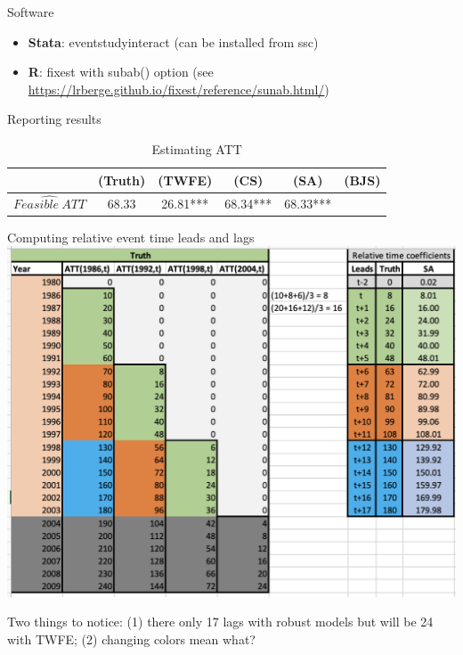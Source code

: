 \documentclass{beamer}
\begin{document}
\begin{frame}{Software}

\begin{itemize}
\item \textbf{Stata}: eventstudyinteract (can be installed from ssc)
\item \textbf{R}: fixest with subab() option (see \url{https://lrberge.github.io/fixest/reference/sunab.html/})
\end{itemize}


\end{frame}


\begin{frame}{Reporting results}
\begin{table}[htbp]\centering
\small
\caption{Estimating ATT}
\begin{center}
\begin{tabular}{l*{5}{c}}
\hline
\multicolumn{1}{l}{\textbf{}}&
\multicolumn{1}{c}{\textbf{(Truth)}}&
\multicolumn{1}{c}{\textbf{(TWFE)}}&
\multicolumn{1}{c}{\textbf{(CS)}}&
\multicolumn{1}{c}{\textbf{(SA)}}&
\multicolumn{1}{c}{\textbf{(BJS)}}\\
\hline
$\widehat{Feasible\ ATT}$  & 68.33    & 26.81*** & 68.34*** & 68.33***&\\
\hline
\end{tabular}
\end{center}
\end{table}

\end{frame}

\begin{frame}{Computing relative event time leads and lags }
             \includegraphics[scale=0.45]{./lecture_includes/sa_leads}

Two things to notice: (1) there only 17 lags with robust models but will be 24 with TWFE; (2) changing colors mean what?

\end{frame}
\end{document}
